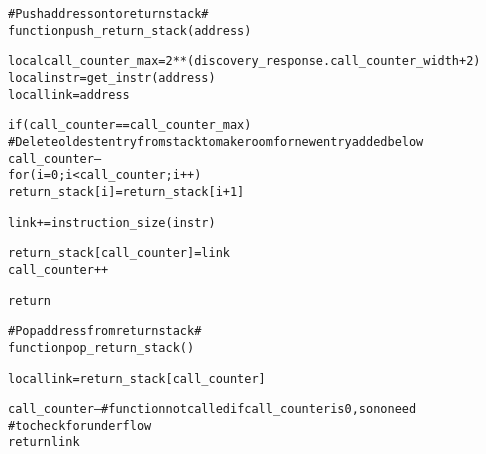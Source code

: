 \pagebreak

\begin{alltt}
# Push address onto return stack #
function push_return_stack (address)

  local call_counter_max = 2**(discovery_response.call_counter_width + 2)
  local instr            = get_instr(address)
  local link             = address

  if (call_counter == call_counter_max)
    # Delete oldest entry from stack to make room for new entry added below
    call_counter--
    for (i = 0; i < call_counter; i++)
      return_stack[i] = return_stack[i+1]

  link += instruction_size(instr)

  return_stack[call_counter] = link
  call_counter++

  return

# Pop address from return stack #
function pop_return_stack ()

  local link = return_stack[call_counter]

  call_counter-- # function not called if call_counter is 0, so no need
                 #  to check for underflow
  return link
\end{alltt}
